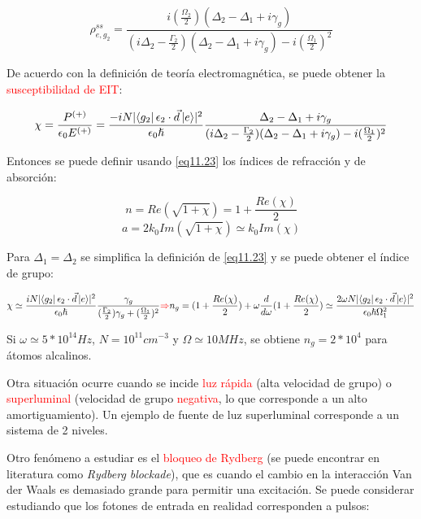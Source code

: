 \documentclass{book}
\begin{document}
\begin{equation}\label{eq11.22}\rho_{e,g_2}^{ss}=\frac{i(\frac{\Omega_2}{2})(\Delta_2-\Delta_1+i\gamma_g)}{(i\Delta_2-\frac{\Gamma_2}{2})(\Delta_2-\Delta_1+i\gamma_g)-i(\frac{\Omega_1}{2})^2}\end{equation}

De acuerdo con la definición de teoría electromagnética, se puede obtener la \textcolor{red}{susceptibilidad de EIT}:

\begin{equation}\label{eq11.23}\chi=\frac{P^{(+)}}{\epsilon_0 E^{(+)}}=\frac{-iN\lvert\bra{g_2}\epsilon_2\cdot\vec{d}\ket{e}\rvert^2}{\epsilon_0\hslash}\frac{\Delta_2-\Delta_1+i\gamma_g}{(i\Delta_2-\frac{\Gamma_2}{2})(\Delta_2-\Delta_1+i\gamma_g)-i(\frac{\Omega_1}{2})^2}\end{equation}

Entonces se puede definir usando \ref{eq11.23} los índices de refracción y de absorción:

\begin{equation}\label{eq11.24}n=Re(\sqrt{1+\chi})=1+\frac{Re(\chi)}{2}\end{equation}
\begin{equation}\label{eq11.25}a=2k_0Im(\sqrt{1+\chi})\simeq k_0Im(\chi)\end{equation}

Para $\Delta_1=\Delta_2$ se simplifica la definición de \ref{eq11.23} y se puede obtener el índice de grupo:

\begin{equation}\label{eq11.26}\chi\simeq\frac{iN\lvert\bra{g_2}\epsilon_2\cdot\vec{d}\ket{e}\rvert^2}{\epsilon_0\hslash}\frac{\gamma_g}{(\frac{\Gamma_2}{2})\gamma_g+(\frac{\Omega_1}{2})^2}\textcolor{red}{\Rightarrow}n_g=(1+\frac{Re(\chi)}{2})+\omega\frac{d}{d\omega}(1+\frac{Re(\chi)}{2})\simeq \frac{2\omega N\lvert\bra{g_2}\epsilon_2\cdot\vec{d}\ket{e}\rvert^2}{\epsilon_0\hslash\Omega_1^2}\end{equation}

Si $\omega\simeq 5*10^{14}Hz$, $N=10^{11} cm^{-3}$ y $\Omega\simeq 10 MHz$, se obtiene $n_g=2*10^4$ para átomos alcalinos.

Otra situación ocurre cuando se incide \textcolor{red}{luz rápida} (alta velocidad de grupo) o \textcolor{red}{superluminal} (velocidad de grupo \textcolor{red}{negativa}, lo que corresponde a un alto amortiguamiento). Un ejemplo de fuente de luz superluminal corresponde a un sistema de 2 niveles.

Otro fenómeno a estudiar es el \textcolor{red}{bloqueo de Rydberg} (se puede encontrar en literatura como \textit{Rydberg blockade}), que es cuando el cambio en la interacción Van der Waals es demasiado grande para permitir una excitación. Se puede considerar estudiando que los fotones de entrada en realidad corresponden a pulsos:
\end{document}
